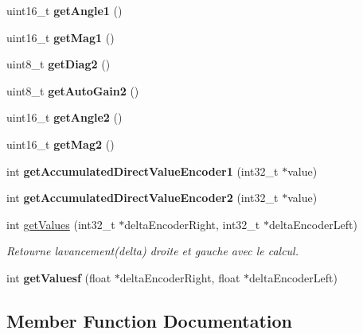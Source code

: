 \begin{DoxyCompactItemize}
uint16\+\_\+t {\bfseries get\+Angle1} ()
\item 
\mbox{\label{classMagEncoders_a014a3d2c418af7f16fcc6f7354b26c04}} 
uint16\+\_\+t {\bfseries get\+Mag1} ()
\item 
\mbox{\label{classMagEncoders_a327839a5b48ab863cd348aa1adab9bf3}} 
uint8\+\_\+t {\bfseries get\+Diag2} ()
\item 
\mbox{\label{classMagEncoders_a617d992ed7ffee122d91b1c7f3738b5b}} 
uint8\+\_\+t {\bfseries get\+Auto\+Gain2} ()
\item 
\mbox{\label{classMagEncoders_acb178f4b88ec0e02a6c957c303fe001f}} 
uint16\+\_\+t {\bfseries get\+Angle2} ()
\item 
\mbox{\label{classMagEncoders_aeced5d9ea36902964fead461be3b1218}} 
uint16\+\_\+t {\bfseries get\+Mag2} ()
\item 
\mbox{\label{classMagEncoders_aae87058c64b2d94e42fa0f8ab14bce1d}} 
int {\bfseries get\+Accumulated\+Direct\+Value\+Encoder1} (int32\+\_\+t $\ast$value)
\item 
\mbox{\label{classMagEncoders_a2cc8c7c1b2da66f9fc79251d538b90ab}} 
int {\bfseries get\+Accumulated\+Direct\+Value\+Encoder2} (int32\+\_\+t $\ast$value)
\item 
int \hyperlink{classMagEncoders_afd6318e2efab28709ef4387c8ac8d695}{get\+Values} (int32\+\_\+t $\ast$delta\+Encoder\+Right, int32\+\_\+t $\ast$delta\+Encoder\+Left)
\begin{DoxyCompactList}\small\item\em Retourne l\textquotesingle{}avancement(delta) droite et gauche avec le calcul. \end{DoxyCompactList}\item 
\mbox{\label{classMagEncoders_adfc64e0a4a2aab2839922bd1f6aecb76}} 
int {\bfseries get\+Valuesf} (float $\ast$delta\+Encoder\+Right, float $\ast$delta\+Encoder\+Left)
\end{DoxyCompactItemize}


\subsection{Member Function Documentation}
\mbox{\label{classMagEncoders_afd6318e2efab28709ef4387c8ac8d695}} 

